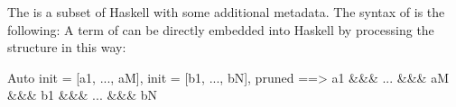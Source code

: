 The \LangB is a subset of Haskell with some additional metadata.
The syntax of \LangB is the following:
%  
A term of \LangB can be directly embedded into Haskell by processing the  structure in this way:
\begin{code}
  Auto { init = [a1, ..., aM], init = [b1, ..., bN], pruned } ==>
  a1 &&& ... &&& aM &&& b1 &&& ... &&& bN
\end{code}

